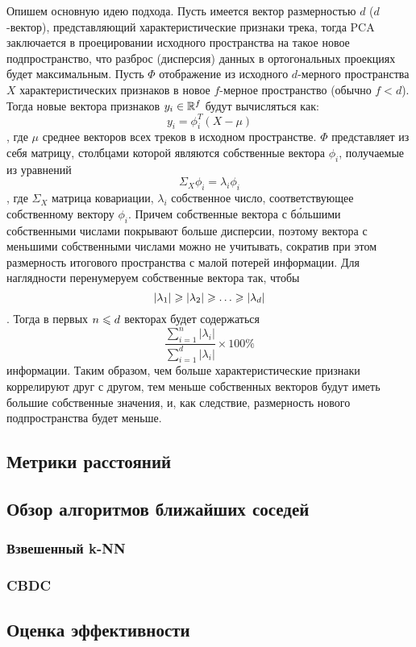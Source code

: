 Опишем основную идею подхода. Пусть имеется вектор размерностью $d$ ($d$-вектор), представляющий характеристические признаки трека, тогда PCA заключается в проецировании исходного пространства
на такое новое подпространство, что разброс (дисперсия) данных в ортогональных проекциях будет максимальным. Пусть $\Phi$ \ld отображение из исходного $d$-мерного пространства $X$ характеристических
признаков в новое $f$-мерное пространство (обычно $f < d$). Тогда новые вектора признаков $y_i \in \mathbb{R}^f$ будут вычисляться как:
$$ y_i = \phi_i^T(X - \mu) $$,
где $\mu$ \ld среднее векторов всех треков в исходном пространстве. $\Phi$ представляет из себя матрицу, столбцами которой являются собственные вектора $\phi_i$, получаемые из уравнений
$$\Sigma_X \phi_i = \lambda_i\phi_i $$,
где $\Sigma_X$ \ld матрица ковариации, $\lambda_i$ \ld собственное число, соответствующее собственному вектору $\phi_i$. Причем собственные вектора с б\'{о}льшими собственными числами покрывают
больше дисперсии, поэтому вектора с меньшими собственными числами можно не учитывать, сократив при этом размерность итогового пространства с малой потерей информации. Для наглядности 
перенумеруем собственные вектора так, чтобы
$$|\lambda_1| \geqslant |\lambda_2| \geqslant \ldots \geqslant |\lambda_d|$$.
Тогда в первых $n \leqslant d$ векторах будет содержаться 
$$\frac{\sum_{i=1}^{n} |\lambda_i|}{\sum_{i=1}^{d} |\lambda_i|} \times 100\%$$ 
информации. Таким образом, чем больше характеристические признаки коррелируют друг с другом, тем меньше собственных векторов будут иметь большие собственные значения, и, как следствие, размерность нового подпространства
будет меньше.

\subsection{Метрики расстояний}



\subsection{Обзор алгоритмов ближайших соседей}
\subsubsection{Взвешенный k-NN}
\subsubsection{CBDC}


\subsection{Оценка эффективности}

